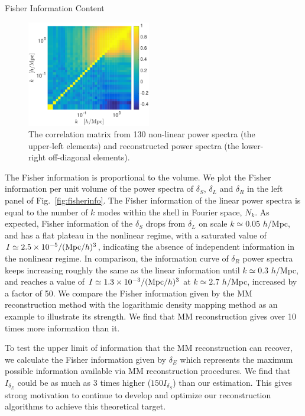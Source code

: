 \begin{section}{Fisher Information Content}
  \begin{figure}
    \centering
    \includegraphics[width=0.48\textwidth]{fig3.pdf}
    \caption{The correlation matrix from 130 non-linear power
      spectra (the upper-left elements) and reconstructed power
      spectra (the lower-right off-diagonal elements).}
    \label{fig:corrall}
  \end{figure}

  The Fisher information is proportional to the volume. 
  We plot the Fisher information per unit volume of the power spectra of
  $\delta_S$, $\delta_L$ and $\delta_R$ in the left panel of 
  Fig.~\ref{fig:fisherinfo}. The Fisher information of the linear 
  power spectra is equal to the number of $k$ modes within the shell in 
  Fourier space, $N_k$. As expected, Fisher information of the
  $\delta_S$ drops from $\delta_L$ on scale
  $k \simeq 0.05$ $h$/Mpc, and has a flat plateau in the nonlinear
  regime, with a saturated value of
  $I \simeq 2.5 \times 10^{-5}/({\rm Mpc}/h)^3$, indicating
  the absence of independent information in the nonlinear
  regime.  In comparison, the information curve of $\delta_R$ power
  spectra keeps increasing roughly the same as the linear information
  until $k\simeq 0.3$ $h$/Mpc, and reaches a value of 
  $I \simeq 1.3 \times 10^{-3}/({\rm Mpc}/h)^3$ at $k \simeq 2.7$ $h$/Mpc,
  increased by a factor of 50.
  We compare the Fisher information given by the MM reconstruction method
  with the logarithmic density mapping method \cite{bib:Mark2009} as
  an example to illustrate its strength. We find that MM
  reconstruction gives over 10 times more information than it.
  
  To test the upper limit of information that the MM reconstruction can recover, 
  we calculate the Fisher information given by $\delta_E$ \cite{bib:Yu2016} 
  which represents the maximum possible information available via MM reconstruction procedures.
  We find that $I_{\delta_E}$ could be as much as 3 times higher ($150 I_{\delta_S}$) than our estimation.
  This gives strong motivation to continue to develop and optimize our 
  reconstruction algorithms to achieve this theoretical target.


\end{section}
